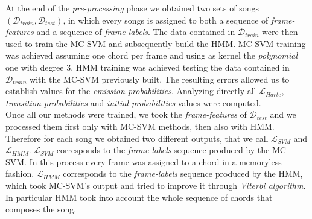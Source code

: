 %
At the end of the \textit{pre-processing} phase we obtained two sets of songs $(\mathcal{D}_{train},\mathcal{D}_{test})$, in which every songs is assigned to both a sequence of \textit{frame-features} and a sequence of \textit{frame-labels}. The data contained in $\mathcal{D}_{train}$ were then used to train the MC-SVM and subsequently build the HMM. MC-SVM training was achieved assuming one chord per frame and using as kernel the \textit{polynomial} one with degree $3$. HMM training was achieved testing the data contained in $\mathcal{D}_{train}$ with the MC-SVM previously built. The resulting errors allowed us to establish values for the \textit{emission probabilities}. Analyzing directly all $\mathcal{L}_{Harte}$, \textit{transition probabilities} and \textit{initial probabilities} values were computed. \\
%
Once all our methods were trained, we took the \textit{frame-features} of $\mathcal{D}_{test}$ and we processed them first only with MC-SVM methods, then also with HMM. Therefore for each song we obtained two different outputs, that we call $\mathcal{L}_{SVM}$ and $\mathcal{L}_{HMM}$. $\mathcal{L}_{SVM}$ corresponds to the \textit{frame-labels} sequence produced by the MC-SVM. In this process every frame was assigned to a chord in a memoryless fashion. $\mathcal{L}_{HMM}$ corresponds to the \textit{frame-labels} sequence produced by the HMM, which took MC-SVM's output and tried to improve it through \textit{Viterbi algorithm}. In particular HMM took into account the whole sequence of chords that composes the song.
